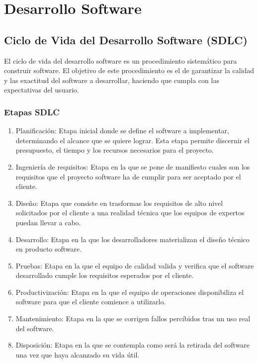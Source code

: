 \documentclass[a4paper,11pt]{book}
\begin{document}
\section{Desarrollo Software}

\subsection{Ciclo de Vida del Desarrollo Software (SDLC) }

El ciclo de vida del desarrollo software es un procedimiento sistemático para construir software.  El objetivo de este procedimiento es el de garantizar la calidad y las exactitud del software a desarrollar, haciendo que cumpla con las expectativas del usuario. 
   
\subsubsection{Etapas SDLC}

\begin{enumerate}
\item  Planificación: Etapa inicial donde se define el software a implementar, determinando el alcance que se quiere lograr. Esta etapa permite discernir el presupuesto, el tiempo y los recursos necesarios para el proyecto. 
\item Ingeniería de requisitos: Etapa en la que se pone de manifiesto cuales son los requisitos que el proyecto software ha de cumplir para ser aceptado por el cliente. 
\item Diseño: Etapa que consiste en trasformas los requisitos de alto nivel solicitados por el cliente a una realidad técnica que los equipos de expertos puedan llevar a cabo. 
\item Desarrollo: Etapa en la que los desarrolladores materializan el diseño técnico en producto software. 
\item Pruebas: Etapa en la que el equipo de calidad valida y verifica que el software desarrollado cumple los requisitos esperados por el cliente. 
\item Productivización:  Etapa en la que el equipo de operaciones disponibiliza el software para que el cliente comience a utilizarlo.
\item Mantenimiento: Etapa en la que se corrigen fallos percibidos tras un uso real del software. 
\item Disposición: Etapa en la que se contempla como será la retirada del software una vez que haya alcanzado su vida útil. 
\end{enumerate}
\end{document}
